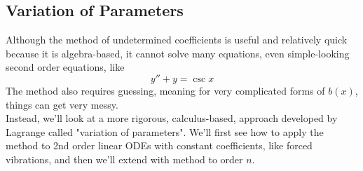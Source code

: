 \subsection{Variation of Parameters}
\noindent
Although the method of undetermined coefficients is useful and relatively quick because it is algebra-based, it cannot solve many equations, even simple-looking second order equations, like
\begin{equation*}
	y'' + y = \csc{x}
\end{equation*}
The method also requires guessing, meaning for very complicated forms of $b(x)$, things can get very messy.\\

\noindent
Instead, we'll look at a more rigorous, calculus-based, approach developed by Lagrange called "variation of parameters". We'll first see how to apply the method to 2nd order linear ODEs with constant coefficients, like forced vibrations, and then we'll extend with method to order $n$.


